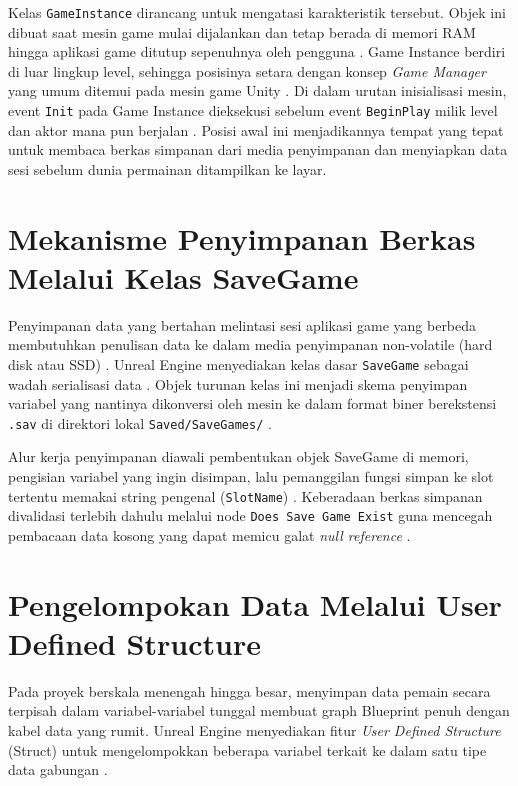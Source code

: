\documentclass[a4paper,oneside,12pt]{report}
\begin{document}
Kelas \texttt{GameInstance} dirancang untuk mengatasi karakteristik tersebut. Objek ini dibuat saat mesin game mulai dijalankan dan tetap berada di memori RAM hingga aplikasi game ditutup sepenuhnya oleh pengguna \cite{epic-gameinstance}. Game Instance berdiri di luar lingkup level, sehingga posisinya setara dengan konsep \textit{Game Manager} yang umum ditemui pada mesin game Unity \cite{modul5}. Di dalam urutan inisialisasi mesin, event \texttt{Init} pada Game Instance dieksekusi sebelum event \texttt{BeginPlay} milik level dan aktor mana pun berjalan \cite{epic-forum-lifecycle}. Posisi awal ini menjadikannya tempat yang tepat untuk membaca berkas simpanan dari media penyimpanan dan menyiapkan data sesi sebelum dunia permainan ditampilkan ke layar.

\section{Mekanisme Penyimpanan Berkas Melalui Kelas SaveGame}
Penyimpanan data yang bertahan melintasi sesi aplikasi game yang berbeda membutuhkan penulisan data ke dalam media penyimpanan non-volatile (hard disk atau SSD) \cite{epic-savegame}. Unreal Engine menyediakan kelas dasar \texttt{SaveGame} sebagai wadah serialisasi data \cite{modul5}. Objek turunan kelas ini menjadi skema penyimpan variabel yang nantinya dikonversi oleh mesin ke dalam format biner berekstensi \texttt{.sav} di direktori lokal \texttt{Saved/SaveGames/} \cite{epic-savegame}.

Alur kerja penyimpanan diawali pembentukan objek SaveGame di memori, pengisian variabel yang ingin disimpan, lalu pemanggilan fungsi simpan ke slot tertentu memakai string pengenal (\texttt{SlotName}) \cite{modul5,yt-savegame}. Keberadaan berkas simpanan divalidasi terlebih dahulu melalui node \texttt{Does Save Game Exist} guna mencegah pembacaan data kosong yang dapat memicu galat \textit{null reference} \cite{epic-savegame}.

\section{Pengelompokan Data Melalui User Defined Structure}
Pada proyek berskala menengah hingga besar, menyimpan data pemain secara terpisah dalam variabel-variabel tunggal membuat graph Blueprint penuh dengan kabel data yang rumit. Unreal Engine menyediakan fitur \textit{User Defined Structure} (Struct) untuk mengelompokkan beberapa variabel terkait ke dalam satu tipe data gabungan \cite{epic-structs}. 
\end{document}
